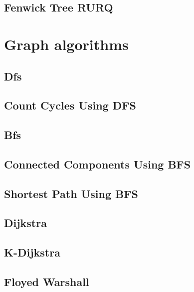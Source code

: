 \subsection{Fenwick Tree RURQ}
\raggedbottom
\hrulefill


\section{Graph algorithms}
\subsection{Dfs}
\raggedbottom
\hrulefill
\subsection{Count Cycles Using DFS}
\raggedbottom
\hrulefill
\subsection{Bfs}
\raggedbottom
\hrulefill
\subsection{Connected Components Using BFS}
\raggedbottom
\hrulefill
\subsection{Shortest Path Using BFS}
\raggedbottom
\hrulefill
\subsection{Dijkstra}
\raggedbottom
\hrulefill
\subsection{K-Dijkstra}
\raggedbottom
\hrulefill
\subsection{Floyed Warshall}
\raggedbottom
\hrulefill
